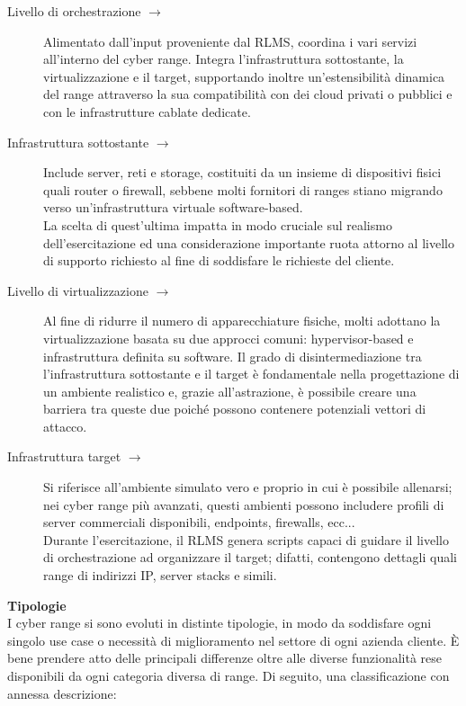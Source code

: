     \begin{description}
        \item[Livello di orchestrazione $\rightarrow$] Alimentato dall'input proveniente dal RLMS, coordina i vari servizi all'interno del cyber range. Integra l'infrastruttura sottostante, la virtualizzazione e il target, supportando inoltre un'estensibilità dinamica del range attraverso la sua compatibilità con dei cloud privati o pubblici e con le infrastrutture cablate dedicate.
        \item[Infrastruttura sottostante $\rightarrow$] Include server, reti e storage, costituiti da un insieme di dispositivi fisici quali router o firewall, sebbene molti fornitori di ranges stiano migrando verso un'infrastruttura virtuale software-based.\\
        La scelta di quest'ultima impatta in modo cruciale sul realismo dell'esercitazione ed una considerazione importante ruota attorno al livello di supporto richiesto al fine di soddisfare le richieste del cliente.
        \item[Livello di virtualizzazione $\rightarrow$] Al fine di ridurre il numero di apparecchiature fisiche, molti adottano la virtualizzazione basata su due approcci comuni: hypervisor-based e infrastruttura definita su software. Il grado di disintermediazione tra l'infrastruttura sottostante e il target è fondamentale nella progettazione di un ambiente realistico e, grazie all'astrazione, è possibile creare una barriera tra queste due poiché possono contenere potenziali vettori di attacco.
        \item[Infrastruttura target $\rightarrow$] Si riferisce all'ambiente simulato vero e proprio in cui è possibile allenarsi; nei cyber range più avanzati, questi ambienti possono includere profili di server commerciali disponibili, endpoints, firewalls, ecc...\\
        Durante l'esercitazione, il RLMS genera scripts capaci di guidare il livello di orchestrazione ad organizzare il target; difatti, contengono dettagli quali range di indirizzi IP, server stacks e simili. 
    \end{description}
    \vspace{0.5em}
    {\bfseries\Large{Tipologie}}\\[1em]
    I cyber range si sono evoluti in distinte tipologie, in modo da soddisfare ogni singolo use case o necessità di miglioramento nel settore di ogni azienda cliente. È bene prendere atto delle principali differenze oltre alle diverse funzionalità rese disponibili da ogni categoria diversa di range. Di seguito, una classificazione con annessa descrizione:
